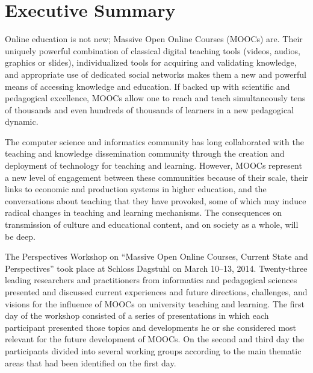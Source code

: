 
\section*{Executive Summary}





Online education is not new; Massive Open Online Courses (MOOCs)
are. Their uniquely powerful combination of classical digital teaching
tools (videos, audios, graphics or slides), individualized tools for
acquiring and validating knowledge, and appropriate use of dedicated
social networks makes them a new and powerful means of accessing
knowledge and education. If backed up with scientific and pedagogical
excellence, MOOCs allow one to reach and teach simultaneously tens of
thousands and even hundreds of thousands of learners in a new
pedagogical dynamic.

The computer science and informatics community has long collaborated
with the teaching and knowledge dissemination community through the
creation and deployment of technology for teaching and learning.
However, MOOCs represent a new level of engagement between these
communities because of their scale, their links to economic and
production systems in higher education, and the conversations about
teaching that they have provoked, some of which may induce radical
changes in teaching and learning mechanisms. The consequences on
transmission of culture and educational content, and on society as a
whole, will be deep.

The Perspectives Workshop on ``Massive Open Online Courses, Current
State and Perspectives'' took place at Schloss Dagstuhl on March 10--13,
2014. 
Twenty-three leading researchers and practitioners from
informatics and pedagogical sciences presented and discussed current
experiences and future directions, challenges, and visions for the
influence of MOOCs on university teaching and learning.
  The first day
of the workshop consisted of a series of presentations in which each
participant presented those topics and developments he or she considered
most relevant for the future development of MOOCs. On the second and
third day the participants divided into several working groups according
to the main thematic areas that had been identified on the first day.

